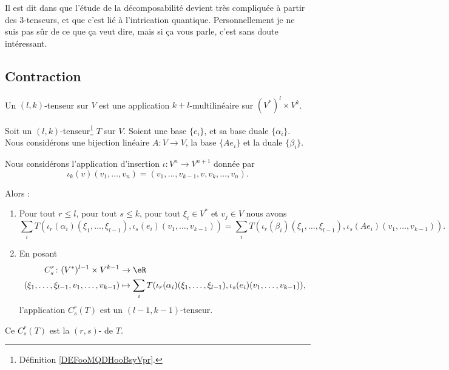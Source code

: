 \begin{normaltext}
	Il est dit dans \cite{BIBooDEEYooRGFyDD} que l'étude de la décomposabilité devient très compliquée à partir des \( 3\)-tenseurs, et que c'est lié à l'intrication quantique. Personnellement je ne suis pas sûr de ce que ça veut dire, mais si ça vous parle, c'est sans doute intéressant.
\end{normaltext}

\subsection{Contraction}

\begin{definition}		\label{DEFooMQDHooBsyVpr}
	Un \( (l,k)\)-tenseur sur \( V\) est une application \( k+l\)-multilinéaire sur \( (V^*)^l\times V^k\).
\end{definition}

\begin{propositionDef}
	Soit un \( (l,k)\)-tenseur\footnote{Définition \ref{DEFooMQDHooBsyVpr}.} \( T\) sur \( V\). Soient une base \( \{ e_i \}\), et sa base duale \( \{ \alpha_i \}\). Nous considérons une bijection linéaire \(A \colon V\to V  \), la base \( \{ Ae_i \}\) et la duale \( \{ \beta_i \}\).

	Nous considérons l'application d'insertion \(\iota \colon V^n\to V^{n+1}  \) donnée par
	\begin{equation}
		\iota_k(v)(v_1,\ldots,v_n)=(v_1,\ldots,v_{k-1},v,v_k,\ldots,v_n).
	\end{equation}

	Alors :
	\begin{enumerate}
		\item		\label{ITEMooSROIooGtTXCL}
		      Pour tout \( r\leq l\), pour tout \( s\leq k\), pour tout \( \xi_i\in V^*\) et \( v_j\in V\) nous avons
		      \begin{equation}
			      \sum_i T(   \iota_r(\alpha_i)(\xi_1,\ldots,\xi_{l-1}), \iota_s(e_i)(v_1,\ldots,v_{k-1})   )=
			      \sum_i T(   \iota_r(\beta_i)(\xi_1,\ldots,\xi_{l-1}), \iota_s(Ae_i)(v_1,\ldots,v_{k-1})   ).
		      \end{equation}
		\item		\label{ITEMooPWLBooOYrluK}
		      En posant
		      \begin{equation}
			      \begin{aligned}
				      C_s^r\colon (V^*)^{l-1}\times V^{k-1}       & \to \eR \\
				      (\xi_1,\ldots,\xi_{l-1},v_1,\ldots,v_{k-1}) & \mapsto
				      \sum_i T(   \iota_r(\alpha_i)(\xi_1,\ldots,\xi_{l-1}), \iota_s(e_i)(v_1,\ldots,v_{k-1})   ),
			      \end{aligned}
		      \end{equation}
		      l'application \( C_s^r(T)\) est un \( (l-1, k-1)\)-tenseur.
	\end{enumerate}
	Ce \( C_s^r(T)\) est la \( (r,s)\)- de \( T\).
\end{propositionDef}

